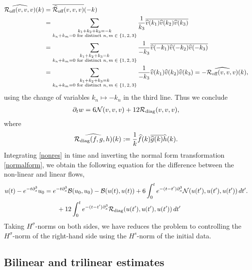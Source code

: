     \begin{align*}
        \widehat{\mathcal R_{\text{off}}(v, v, v)} (k)
            &= \overline{\widehat {\mathcal R}_{\text{off}}(v, v, v)} (-k) \\
            &= \sum_{\substack{k_1 + k_2 + k_3 = -k \\ k_n + k_m = 0 \text{ for distinct $n, m \in \{1,2, 3\}$}}} \frac{1}{k_3}\overline{\widehat{v} (k_1) \widehat v (k_2) \widehat v (k_3)} \\
            &= \sum_{\substack{k_1 + k_2 + k_3 = k \\ k_n + k_m = 0 \text{ for distinct $n, m \in \{1,2, 3\}$}}} \frac{1}{-k_3}\overline{\widehat{v} (-k_1) \widehat v (-k_2) \widehat v (-k_3)} \\
            &= \sum_{\substack{k_1 + k_2 + k_3 = k \\ k_n + k_m = 0 \text{ for distinct $n, m \in \{1,2, 3\}$}}} \frac{1}{-k_3} \widehat{v} (k_1) \widehat v(k_2) \widehat v(k_3) = -  \widehat{\mathcal R_{\text{off}}(v, v, v)} (k),
    \end{align*}
using the change of variables $k_n \mapsto -k_n$ in the third line. Thus we conclude 
    \begin{align}\label{eq:nonres}
        \partial_t w 
            = 6 \mathcal N(v, v, v) + 12 \mathcal R_{\text{diag}} (v, v, v),
    \end{align}
where 
    \[
        \widehat{\mathcal R_{\text{diag}}(f, g, h)} (k)
            := \frac1k \widehat f(k) \overline{\widehat{g}(k)} \widehat h(k). 
    \]
Integrating \eqref{nonres} in time and inverting the normal form transformation \eqref{normalform}, we obtain the following equation for the difference between the non-linear and linear flows, 
    \begin{equation}\label{eq:integral}
        \begin{split}
        u(t) - e^{-t \partial_x^3} u_0 
            &= e^{-t \partial_x^3} \mathcal B(u_0, u_0) - \mathcal B(u(t), u(t)) + 6 \int_0^t e^{-(t - t')\partial_x^3} \mathcal N(u(t'), u(t'), u(t')) \, dt'.\\
            &\qquad + 12 \int_0^t e^{-(t - t')\partial_x^3} \mathcal R_{\mathrm{diag}}(u(t'), u(t'), u(t')) \, dt'
        \end{split}
    \end{equation}
Taking $H^\sigma$-norms on both sides, we have reduces the problem to controlling the $H^\sigma$-norm of the right-hand side using the $H^s$-norm of the initial data. 

\subsection{Bilinear and trilinear estimates}


